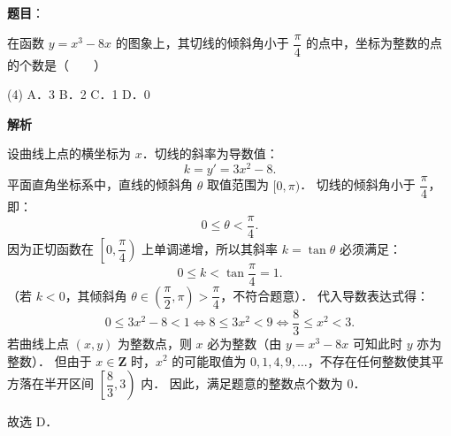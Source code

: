 \begin{answer}

\textbf{题目}：

在函数 $y = x^3 - 8x$ 的图象上，其切线的倾斜角小于 $\dfrac{\pi}{4}$ 的点中，坐标为整数的点的个数是\mbox{（　　）}

\begin{gkopts}(4)
\task A．3
\task B．2
\task C．1
\task D．0
\end{gkopts}

\textbf{解析}

设曲线上点的横坐标为 $x$．切线的斜率为导数值：
\nopagebreak[4]
\[
k = y' = 3x^2 - 8.
\]
平面直角坐标系中，直线的倾斜角 $\theta$ 取值范围为 $[0, \pi)$．
切线的倾斜角小于 $\dfrac{\pi}{4}$，即：
\nopagebreak[4]
\[
0 \leqslant \theta < \frac{\pi}{4}.
\]
因为正切函数在 $\left[0, \dfrac{\pi}{4}\right)$ 上单调递增，所以其斜率 $k = \tan\theta$ 必须满足：
\nopagebreak[4]
\[
0 \leqslant k < \tan\frac{\pi}{4} = 1.
\]
（若 $k < 0$，其倾斜角 $\theta \in \left(\dfrac{\pi}{2}, \pi\right) > \dfrac{\pi}{4}$，不符合题意）．
代入导数表达式得：
\nopagebreak[4]
\[
0 \leqslant 3x^2 - 8 < 1 \iff 8 \leqslant 3x^2 < 9 \iff \frac{8}{3} \leqslant x^2 < 3.
\]
若曲线上点 $(x, y)$ 为整数点，则 $x$ 必为整数（由 $y = x^3 - 8x$ 可知此时 $y$ 亦为整数）．
但由于 $x \in \mathbf{Z}$ 时，$x^2$ 的可能取值为 $0, 1, 4, 9, \dots$，不存在任何整数使其平方落在半开区间 $\left[\dfrac{8}{3}, 3\right)$ 内．
因此，满足题意的整数点个数为 0．

故选 D．


\end{answer}
